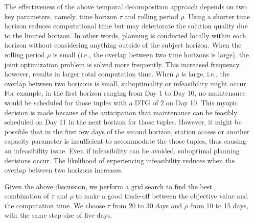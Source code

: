 The effectiveness of the above temporal decomposition approach depends on two key parameters, namely, time horizon $\tau$ and rolling period $\rho$. Using a shorter time horizon reduces computational time but may deteriorate the solution quality due to the limited horizon. In other words, planning is conducted locally within each horizon without considering anything outside of the subject horizon. When the rolling period $\rho$ is small (i.e., the overlap between two time horizons is large), the joint optimization problem is solved more frequently.
This increased frequency, however, results in larger total computation time. When $\rho$ is large, i.e., the overlap between two horizons is small, suboptimality or infeasibility might occur. For example, in the first horizon ranging from Day 1 to Day 10, no maintenance would be scheduled for those tuples with a DTG of 2 on Day 10. This myopic decision is made because of the anticipation that maintenance can be feasibly scheduled on Day 11 in the next horizon for those tuples. However, it might be possible that in the first few days of the second horizon, station access or another capacity parameter is insufficient to accommodate the those tuples, thus causing an infeasibility issue. Even if infeasibility can be avoided, suboptimal planning decisions occur. The likelihood of experiencing infeasibility reduces when the overlap between two horizons increases.

Given the above discussion, we perform a grid search to find the best combination of $\tau$ and $\rho$ to make a good trade-off between the objective value and the computation time. We choose $\tau$ from 20 to 30 days and $\rho$ from 10 to 15 days, with the same step size of five days. 








